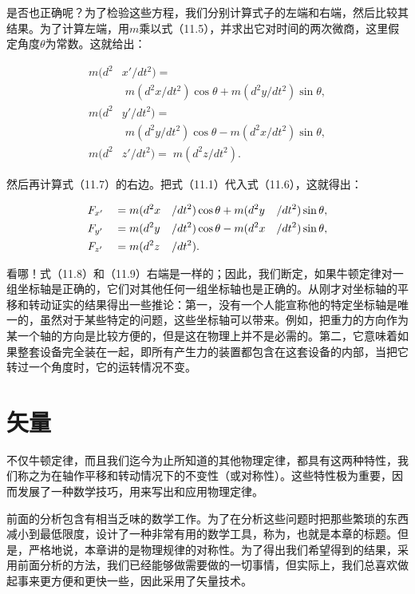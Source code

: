 \documentclass[12pt,oneside]{book}
\begin{document}
是否也正确呢？为了检验这些方程，我们分别计算式子的左端和右端，然后比较其结果。为了计算左端，用$m$乘以式（11.5），并求出它对时间的两次微商，这里假定角度$\theta$为常数。这就给出：

\begin{equation}
\begin{aligned}
m(d^2&x'/dt^2)=\\
&\;m(d^2x/dt^2)\cos\theta+m(d^2y/dt^2)\sin\theta,\\[1ex]
m(d^2&y'/dt^2)=\\
&\;m(d^2y/dt^2)\cos\theta-m(d^2x/dt^2)\sin\theta,\\[1ex]
m(d^2&z'/dt^2)=\;m(d^2z/dt^2).
\end{aligned}
\label{Eq:I:11:8}
\end{equation}

然后再计算式（11.7）的右边。把式（11.1）代入式（11.6），这就得出：

\begin{alignat}{4}
&F_{x'}&&=m(d^2x&&/dt^2)\cos\theta+m(d^2y&&/dt^2)\sin\theta,\notag\\
&F_{y'}&&=m(d^2y&&/dt^2)\cos\theta-m(d^2x&&/dt^2)\sin\theta,\notag\\
\label{Eq:I:11:9}
&F_{z'}&&=m(d^2z&&/dt^2).
\end{alignat}

看哪！式（11.8）和（11.9）右端是一样的；因此，我们断定，如果牛顿定律对一组坐标轴是正确的，它们对其他任何一组坐标轴也是正确的。从刚才对坐标轴的平移和转动证实的结果得出一些推论：第一，没有一个人能宣称他的特定坐标轴是唯一的，虽然对于某些特定的问题，这些坐标轴可以带来。例如，把重力的方向作为某一个轴的方向是比较方便的，但是这在物理上并不是必需的。第二，它意味着如果整套设备完全装在一起，即所有产生力的装置都包含在这套设备的内部，当把它转过一个角度时，它的运转情况不变。


\section{矢量}
不仅牛顿定律，而且我们迄今为止所知道的其他物理定律，都具有这两种特性，我们称之为在轴作平移和转动情况下的不变性（或对称性）。这些特性极为重要，因而发展了一种数学技巧，用来写出和应用物理定律。

前面的分析包含有相当乏味的数学工作。为了在分析这些问题时把那些繁琐的东西减小到最低限度，设计了一种非常有用的数学工具，称为，也就是本章的标题。但是，严格地说，本章讲的是物理规律的对称性。为了得出我们希望得到的结果，采用前面分析的方法，我们已经能够做需要做的一切事情，但实际上，我们总喜欢做起事来更方便和更快一些，因此采用了矢量技术。
\end{document}
